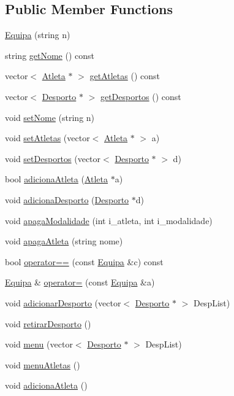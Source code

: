 \subsection*{Public Member Functions}
\begin{DoxyCompactItemize}
\item 
\hyperlink{class_equipa_aa318e7b925bfed173bb90d20c63d8a43}{Equipa} (string n)
\item 
string \hyperlink{class_equipa_a9d20d0c8daa94e7562c5ea173337a224}{get\+Nome} () const 
\item 
vector$<$ \hyperlink{class_atleta}{Atleta} $\ast$ $>$ \hyperlink{class_equipa_a24c4de83cc1171ce42f442ef7be8a7c4}{get\+Atletas} () const 
\item 
vector$<$ \hyperlink{class_desporto}{Desporto} $\ast$ $>$ \hyperlink{class_equipa_a6b6996a193cea733caafb99d0ddebbcc}{get\+Desportos} () const 
\item 
void \hyperlink{class_equipa_a0e9f300d552f0c4de6fc28d555141eb5}{set\+Nome} (string n)
\item 
void \hyperlink{class_equipa_a3269b5a8f6c3ebc9370c4cdf004c0b31}{set\+Atletas} (vector$<$ \hyperlink{class_atleta}{Atleta} $\ast$ $>$ a)
\item 
void \hyperlink{class_equipa_ae94bfeafedcf21a1d85db42a7f60b4ea}{set\+Desportos} (vector$<$ \hyperlink{class_desporto}{Desporto} $\ast$ $>$ d)
\item 
bool \hyperlink{class_equipa_a18b0bb0b40831afda4d8baa0730dc40f}{adiciona\+Atleta} (\hyperlink{class_atleta}{Atleta} $\ast$a)
\item 
void \hyperlink{class_equipa_a22daef4c32fcc25228a113a134911565}{adiciona\+Desporto} (\hyperlink{class_desporto}{Desporto} $\ast$d)
\item 
void \hyperlink{class_equipa_a0ff737879e2ece8397d01d1da745a788}{apaga\+Modalidade} (int i\+\_\+atleta, int i\+\_\+modalidade)
\item 
void \hyperlink{class_equipa_ac2252ae9144c32ad2dfb227b9dfb2c15}{apaga\+Atleta} (string nome)
\item 
bool \hyperlink{class_equipa_a754b42e94c0ca91ac2c2a3890e7f3191}{operator==} (const \hyperlink{class_equipa}{Equipa} \&c) const 
\item 
\hyperlink{class_equipa}{Equipa} \& \hyperlink{class_equipa_a372f3177a2f628ddaff2c40ed7d26bf8}{operator=} (const \hyperlink{class_equipa}{Equipa} \&a)
\item 
void \hyperlink{class_equipa_ac2ab600cc917f8709aeda9a71a0a9aa4}{adicionar\+Desporto} (vector$<$ \hyperlink{class_desporto}{Desporto} $\ast$ $>$ Desp\+List)
\item 
void \hyperlink{class_equipa_a90fac8b1f621a9a82b4b32eb3efcdaa4}{retirar\+Desporto} ()
\item 
void \hyperlink{class_equipa_a44df4366958af97be66020a0f8e18a94}{menu} (vector$<$ \hyperlink{class_desporto}{Desporto} $\ast$ $>$ Desp\+List)
\item 
void \hyperlink{class_equipa_a8f8b5838284e2154abe8608f53ee2681}{menu\+Atletas} ()
\item 
void \hyperlink{class_equipa_afead1fbf9a337c39bb771b37dad578d3}{adiciona\+Atleta} ()
\end{DoxyCompactItemize}
